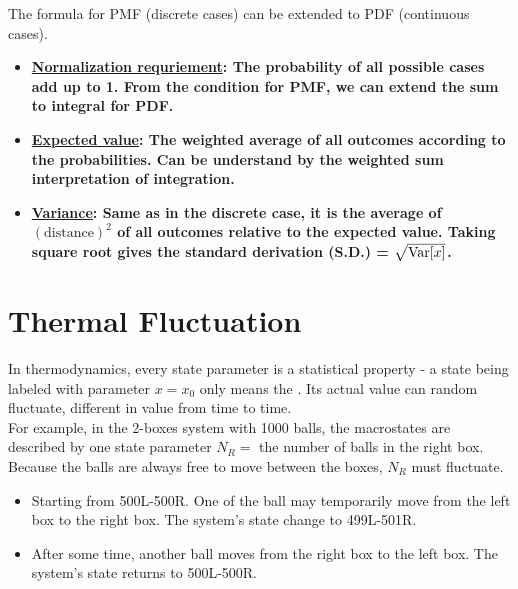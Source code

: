 \documentclass[class=article, crop=false, 12pt]{standalone}
\begin{document}
\newpage
The formula for PMF (discrete cases) can be extended to PDF (continuous cases).
\begin{itemize}
    \item \bf{\ul{Normalization requriement}}: 
    The probability of all possible cases add up to 1.
    From the condition for PMF, we can extend the sum to integral for PDF.

    \item \bf{\ul{Expected value}}: 
    The weighted average of all outcomes according to the probabilities.
    Can be understand by the weighted sum interpretation of integration.

    \item \bf{\ul{Variance}}:
    Same as in the discrete case, it is the average of $(\text{distance})^2$ of all outcomes relative to the expected value.
    Taking square root gives the standard derivation (S.D.) = $\sqrt{\Var{x}}$. 

\end{itemize}


\linesep
\section{Thermal Fluctuation}

In thermodynamics, every state parameter is a statistical property - 
a state being labeled with parameter $x=x_0$ only means the .
Its actual value can random fluctuate, 
different in value from time to time.\\

For example, in the 2-boxes system with 1000 balls, 
the macrostates are described by one state parameter $N_R=$ the number of balls in the right box. 
Because the balls are always free to move between the boxes, 
$N_R$ must fluctuate. 
\begin{itemize}
    \item Starting from 500L-500R. 
    One of the ball may temporarily move from the left box to the right box.
    The system's state change to 499L-501R. 

    \item After some time, another ball moves from the right box to the left box.
    The system's state returns to 500L-500R.
\end{itemize}
\end{document}
